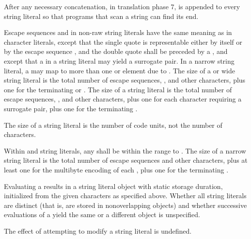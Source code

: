 \pnum
{}%
%
%
After any necessary concatenation, in translation phase
7,  is appended to every
string literal so that programs that scan a string can find its end.

\pnum
Escape sequences and  in non-raw string literals
have the same meaning as in character literals, except that
the single quote  is representable either by itself or by the escape sequence
, and the double quote  shall be preceded by a
\tcode{\textbackslash},
and except that a  in a
 string literal may yield a surrogate pair.
%
In a narrow string literal, a  may map to more
than one  or  element due to . The
size of a  or wide string literal is the total number of
escape sequences, , and other characters, plus
one for the terminating  or
. The size of a  string
literal is the total number of escape sequences,
, and other characters, plus one for each
character requiring a surrogate pair, plus one for the terminating
. \begin{note} The size of a 
string literal is the number of code units, not the number of
characters. \end{note} Within  and 
string literals, any  shall be within the range
 to . The size of a narrow string literal is
the total number of escape sequences and other characters, plus at least
one for the multibyte encoding of each , plus
one for the terminating .

\pnum
Evaluating a  results in a string literal object
with static storage duration, initialized from the given characters as
specified above.
%
Whether all string literals are distinct (that is, are stored in
nonoverlapping objects) and whether successive evaluations of a
 yield the same or a different object is
unspecified.
\begin{note}
%
The effect of attempting to modify a string literal is undefined. \end{note}

